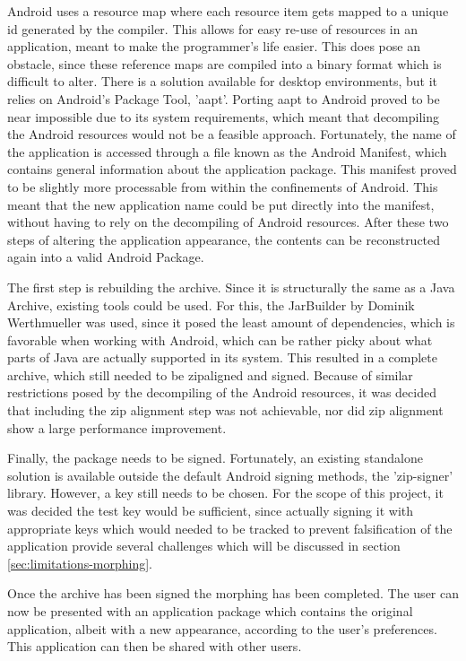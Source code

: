 Android uses a resource map where each resource item gets mapped to a unique id generated by the compiler. 
This allows for easy re-use of resources in an application, meant to make the programmer's life easier.
This does pose an obstacle, since these reference maps are compiled into a binary format which is difficult to alter.
There is a solution available for desktop environments, but it relies on Android's Package Tool, 'aapt'. \cite{website:apktool}
Porting aapt to Android proved to be near impossible due to its system requirements, which meant that decompiling the Android resources would not be a feasible approach.
Fortunately, the name of the application is accessed through a file known as the Android Manifest, which contains general information about the application package.
This manifest proved to be slightly more processable from within the confinements of Android.
This meant that the new application name could be put directly into the manifest, without having to rely on the decompiling of Android resources.
After these two steps of altering the application appearance, the contents can be reconstructed again into a valid Android Package.

The first step is rebuilding the archive. 
Since it is structurally the same as a Java Archive, existing tools could be used. 
For this, the JarBuilder by Dominik Werthmueller was used, since it posed the least amount of dependencies, which is favorable when working with Android, which can be rather picky about what parts of Java are actually supported in its system. \cite{website:jarbuilder}
This resulted in a complete archive, which still needed to be zipaligned and signed.
Because of similar restrictions posed by the decompiling of the Android resources, it was decided that including the zip alignment step was not achievable, nor did zip alignment show a large performance improvement.

Finally, the package needs to be signed. 
Fortunately, an existing standalone solution is available outside the default Android signing methods, the 'zip-signer' library. \cite{website:zip-signer}
However, a key still needs to be chosen. 
For the scope of this project, it was decided the test key would be sufficient, since actually signing it with appropriate keys which would needed to be tracked to prevent falsification of the application provide several challenges which will be discussed in section \ref{sec:limitations-morphing}.

Once the archive has been signed the morphing has been completed. 
The user can now be presented with an application package which contains the original application, albeit with a new appearance, according to the user's preferences.
This application can then be shared with other users.



